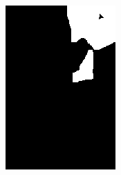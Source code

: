 \begin{figure}[h]
{\begin{subfigure}[b]{0.23\textwidth}
     \end{subfigure}
     \hfill
     \begin{subfigure}[b]{0.23\textwidth}
         \centering
         \includegraphics[width=\textwidth]{images/results/cross_st/clay_dark_med_y.png}
     \end{subfigure}
    \hfill
     \begin{subfigure}[b]{0.23\textwidth}
         \centering

\end{subfigure}}
\end{figure}
